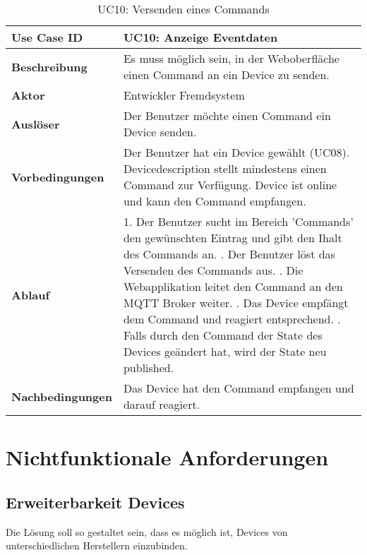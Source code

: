 \begin{table}[H]
\begin{tabularx}{\textwidth}{|l|X|}

 \hline
 {\bf Use Case ID }    & UC10: Anzeige Eventdaten \\  \hline
 {\bf Beschreibung }   & Es muss möglich sein, in der Weboberfläche einen Command an ein Device zu senden. \\ \hline
 {\bf Aktor }          & Entwickler Fremdsystem \\ \hline
 {\bf Auslöser }       & Der Benutzer möchte einen Command ein Device senden. \\ \hline
 {\bf Vorbedingungen } & 
     Der Benutzer hat ein Device gewählt (UC08). \newline
     Devicedescription stellt mindestens einen Command zur Verfügung. \newline 
     Device ist online und kann den Command empfangen. \\ \hline
 {\bf Ablauf }         & 
     1. Der Benutzer sucht im Bereich 'Commands' den gewünschten Eintrag und gibt den Ihalt des Commands an. \newline
     2. Der Benutzer löst das Versenden des Commands aus. \newline
     3. Die Webapplikation leitet den Command an den MQTT Broker weiter. \newline
     4. Das Device empfängt dem Command und reagiert entsprechend. \newline
     5. Falls durch den Command der State des Devices geändert hat, wird der State neu published.
     \\ \hline
 {\bf Nachbedingungen} & Das Device hat den Command empfangen und darauf reagiert. \\ \hline
  
\end{tabularx}
\caption{UC10: Versenden eines Commands}
\end{table}




\section{Nichtfunktionale Anforderungen}

\subsection{Erweiterbarkeit Devices}
Die Lösung soll so gestaltet sein, dass es möglich ist, Devices von unterschiedlichen Herstellern einzubinden.


